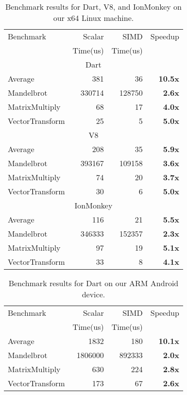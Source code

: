 \documentclass[preprint]{sigplanconf}
\begin{document}
\begin{table}
\begin{center}
\begin{tabular}{|l|r|r|r|}
\hline
 Benchmark & Scalar   & SIMD     & Speedup \\
           & Time(us) & Time(us) &         \\
\hline
\hline
\multicolumn{4}{c}{Dart} \\
\hline
 Average & 381 & 36 & \textbf{10.5x} \\
\hline
 Mandelbrot & 330714 & 128750 & \textbf{2.6x} \\
\hline
 MatrixMultiply & 68 & 17 & \textbf{4.0x} \\
\hline
 VectorTransform & 25 & 5 & \textbf{5.0x} \\
\hline
\hline
\multicolumn{4}{c}{V8} \\
\hline
 Average & 208 & 35 & \textbf{5.9x} \\
 \hline
 Mandelbrot & 393167 & 109158 & \textbf{3.6x} \\
 \hline
 MatrixMultiply & 74 & 20 & \textbf{3.7x} \\
 \hline
 VectorTransform & 30 & 6 & \textbf{5.0x} \\
 \hline
\hline
\multicolumn{4}{c}{IonMonkey} \\
\hline
 Average & 116 & 21 & \textbf{5.5x} \\
 \hline
 Mandelbrot & 346333 & 152357 & \textbf{2.3x} \\
 \hline
 MatrixMultiply & 97 & 19 & \textbf{5.1x} \\
 \hline
 VectorTransform & 33 & 8 & \textbf{4.1x} \\
 \hline
\end{tabular}
\end{center}
\caption{Benchmark results for Dart, V8, and IonMonkey on our x64 Linux
machine.}
\label{tab:x64-benchmarks}
\end{table}


\begin{table}
\begin{center}
\begin{tabular}{|l|r|r|r|}
\hline
Benchmark & Scalar   & SIMD     & Speedup \\
          & Time(us) & Time(us) &         \\
\hline
\hline
Average & 1832 & 180 & \textbf{10.1x} \\
\hline
Mandelbrot & 1806000 & 892333 & \textbf{2.0x} \\
\hline
MatrixMultiply & 630 & 224 & \textbf{2.8x} \\
\hline
VectorTransform & 173 & 67 & \textbf{2.6x} \\
\hline
\end{tabular}
\end{center}
\caption{Benchmark results for Dart on our ARM Android device.}
\label{tab:arm-benchmarks}
\end{table}
\end{document}
